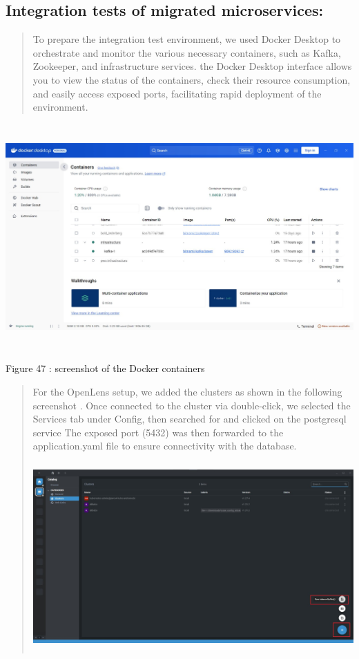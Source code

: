 \documentclass[12pt,a4paper]{report}
\begin{document}
\subsection{\texorpdfstring{\textbf{Integration tests of migrated
microservices:}}{Integration tests of migrated microservices:}}\label{integration-tests-of-migrated-microservices}

\begin{quote}
To prepare the integration test environment, we used Docker Desktop to
orchestrate and monitor the various necessary containers, such as Kafka,
Zookeeper, and infrastructure services. the Docker Desktop interface
allows you to view the status of the containers, check their resource
consumption, and easily access exposed ports, facilitating rapid
deployment of the environment.
\end{quote}

\includegraphics[width=6.32705in,height=3.39625in]{vertopal_d1b0b2209edd4c6aa8254f57daa0953b/media/image66.jpeg}

\protect\hypertarget{_Toc201954523}{}{}Figure 47 : screenshot of the
Docker containers

\begin{quote}
For the OpenLens setup, we added the clusters as shown in the following
screenshot . Once connected to the cluster via double-click, we selected
the Services tab under Config, then searched for and clicked on the
postgresql service The exposed port (5432) was then forwarded to the
application.yaml file to ensure connectivity with the database.

\includegraphics[width=5.22089in,height=2.82793in]{vertopal_d1b0b2209edd4c6aa8254f57daa0953b/media/image67.jpeg}
\end{quote}
\end{document}
